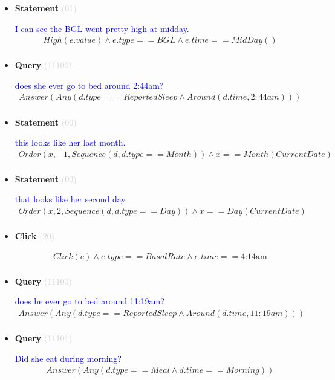 \documentclass[11pt]{article}
\newcommand{\key}[1]{\textcolor{lightgray}{#1}}
\newcounter{CQuery}
\newcounter{CStatement}
\newcounter{CClick}
\begin{document}
\begin{itemize}
\item
\textbf{Statement\theCStatement} \key{(01)} \addtocounter{CStatement}{1}
\textcolor{blue}{ I can see the BGL went pretty high at midday. }
\begin{multline*}
High(e.value) \wedge e.type==BGL \wedge e.time==MidDay() \\ 
\end{multline*}


\item
\textbf{Query\theCQuery} \key{(11100)} \addtocounter{CQuery}{1}
\textcolor{blue}{ does she ever go to bed around 2:44am? }
\begin{multline*}
Answer(Any(d.type==ReportedSleep \wedge Around(d.time, 2:44am))) \\ 
\end{multline*}


\item
\textbf{Statement\theCStatement} \key{(00)} \addtocounter{CStatement}{1}
\textcolor{blue}{ this looks like her last month. }
\begin{multline*}
Order(x, -1, Sequence(d, d.type==Month)) \wedge x==Month(CurrentDate) \\ 
\end{multline*}


\item
\textbf{Statement\theCStatement} \key{(00)} \addtocounter{CStatement}{1}
\textcolor{blue}{ that looks like her second day. }
\begin{multline*}
Order(x, 2, Sequence(d, d.type==Day)) \wedge x==Day(CurrentDate) \\ 
\end{multline*}


\item
\textbf{Click\theCClick} \key{(20)} \addtocounter{CClick}{1}
\textcolor{blue}{  }
\begin{multline*}
Click(e) \wedge e.type==BasalRate \wedge e.time==\mbox{4:14am} \\ 
\end{multline*}


\item
\textbf{Query\theCQuery} \key{(11100)} \addtocounter{CQuery}{1}
\textcolor{blue}{ does he ever go to bed around 11:19am? }
\begin{multline*}
Answer(Any(d.type==ReportedSleep \wedge Around(d.time, 11:19am))) \\ 
\end{multline*}


\item
\textbf{Query\theCQuery} \key{(11101)} \addtocounter{CQuery}{1}
\textcolor{blue}{ Did she eat during morning? }
\begin{multline*}
Answer(Any(d.type==Meal \wedge d.time==Morning)) \\ 
\end{multline*}



\end{itemize}
\end{document}
